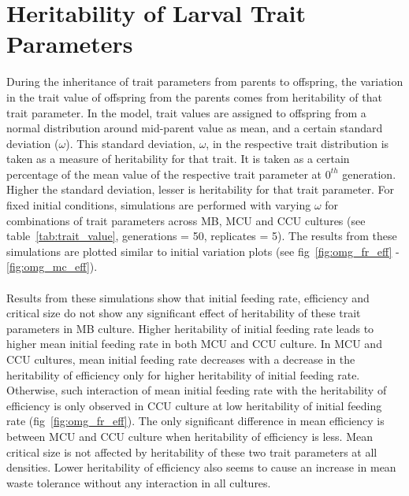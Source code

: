 \section{Heritability of Larval Trait Parameters}
During the inheritance of trait parameters from parents to offspring, the variation in the trait value of offspring from the parents comes from heritability of that trait parameter. In the model, trait values are assigned to offspring from a normal distribution around mid-parent value as mean, and a certain standard deviation ($\omega$). This standard deviation, $\omega$,   in the respective trait distribution is taken as a measure of heritability for that trait. It is taken as a certain percentage of the mean value of the respective trait parameter at $0^{th}$ generation. Higher the standard deviation, lesser is heritability for that trait parameter. For fixed initial conditions, simulations are performed with varying $\omega$ for combinations of trait parameters across MB, MCU and CCU cultures (see table~\ref{tab:trait_value}, generations = 50, replicates = 5). The results from these simulations are plotted similar to initial variation plots (see fig~\ref{fig:omg_fr_eff} - \ref{fig:omg_mc_eff}).\\\\
Results from these simulations show that initial feeding rate, efficiency and critical size do not show any significant effect of heritability of these trait parameters in MB culture. Higher heritability of initial feeding rate leads to higher mean initial feeding rate in both MCU and CCU culture. In MCU and CCU cultures, mean initial feeding rate decreases with a decrease in the heritability of efficiency only for higher heritability of initial feeding rate. Otherwise, such interaction of mean initial feeding rate with the heritability of efficiency is only observed in CCU culture at low heritability of initial feeding rate (fig~\ref{fig:omg_fr_eff}). The only significant difference in mean efficiency is between MCU and CCU culture when heritability of efficiency is less. Mean critical size is not affected by heritability of these two trait parameters at all densities. Lower heritability of efficiency also seems to cause an increase in mean waste tolerance without any interaction in all cultures.

